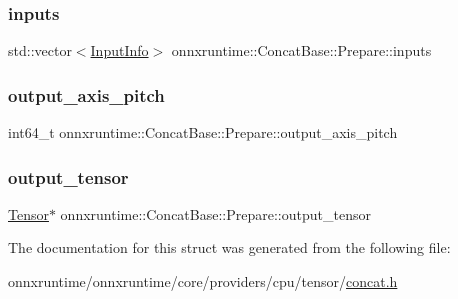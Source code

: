 \subsubsection{\texorpdfstring{inputs}{inputs}}
{\footnotesize\ttfamily std\+::vector$<$\mbox{\hyperlink{structonnxruntime_1_1ConcatBase_1_1Prepare_1_1InputInfo}{Input\+Info}}$>$ onnxruntime\+::\+Concat\+Base\+::\+Prepare\+::inputs}

\mbox{\label{structonnxruntime_1_1ConcatBase_1_1Prepare_adf60065c0997888e31f2891996644f52}} 
\subsubsection{\texorpdfstring{output\+\_\+axis\+\_\+pitch}{output\_axis\_pitch}}
{\footnotesize\ttfamily int64\+\_\+t onnxruntime\+::\+Concat\+Base\+::\+Prepare\+::output\+\_\+axis\+\_\+pitch}

\mbox{\label{structonnxruntime_1_1ConcatBase_1_1Prepare_a6511a98f052251feb4435c064bea594d}} 
\subsubsection{\texorpdfstring{output\+\_\+tensor}{output\_tensor}}
{\footnotesize\ttfamily \mbox{\hyperlink{classonnxruntime_1_1Tensor}{Tensor}}$\ast$ onnxruntime\+::\+Concat\+Base\+::\+Prepare\+::output\+\_\+tensor}



The documentation for this struct was generated from the following file\+:\begin{DoxyCompactItemize}
\item 
onnxruntime/onnxruntime/core/providers/cpu/tensor/\mbox{\hyperlink{cpu_2tensor_2concat_8h}{concat.\+h}}\end{DoxyCompactItemize}
